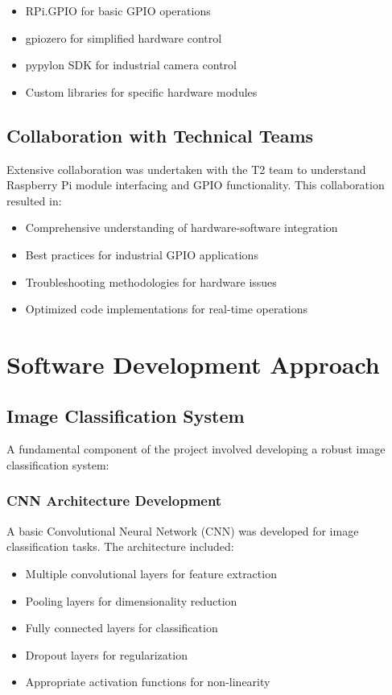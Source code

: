 \documentclass{book}
\begin{document}
\begin{itemize}
\item RPi.GPIO for basic GPIO operations
\item gpiozero for simplified hardware control
\item pypylon SDK for industrial camera control
\item Custom libraries for specific hardware modules
\end{itemize}

\subsection{Collaboration with Technical Teams}
\par\noindent Extensive collaboration was undertaken with the T2 team to understand Raspberry Pi module interfacing and GPIO functionality. This collaboration resulted in:

\begin{itemize}
\item Comprehensive understanding of hardware-software integration
\item Best practices for industrial GPIO applications
\item Troubleshooting methodologies for hardware issues
\item Optimized code implementations for real-time operations
\end{itemize}

\section{Software Development Approach}

\subsection{Image Classification System}
\par\noindent A fundamental component of the project involved developing a robust image classification system:

\subsubsection{CNN Architecture Development}
\par\noindent A basic Convolutional Neural Network (CNN) was developed for image classification tasks. The architecture included:

\begin{itemize}
\item Multiple convolutional layers for feature extraction
\item Pooling layers for dimensionality reduction
\item Fully connected layers for classification
\item Dropout layers for regularization
\item Appropriate activation functions for non-linearity
\end{itemize}
\end{document}
